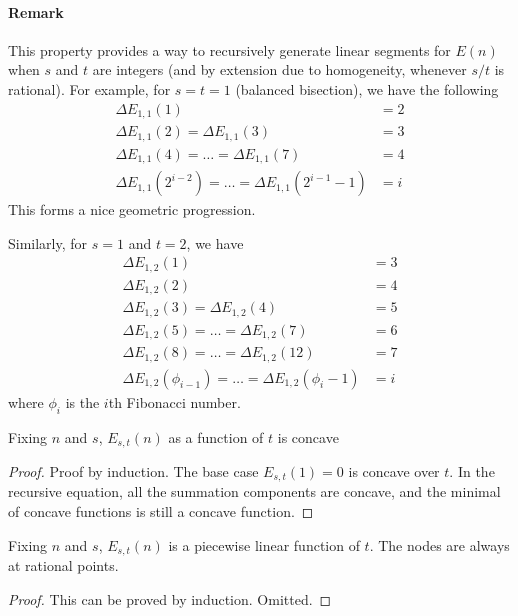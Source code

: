 \documentclass[]{article}
\begin{document}
\paragraph{Remark}

This property provides a way to recursively generate linear segments for $E(n)$ when $s$ and $t$ are integers (and by extension due to homogeneity, whenever $s/t$ is rational). For example, for $s = t = 1$ (balanced bisection), we have the following
\begin{align*}
\Delta E_{1,1}(1) &= 2 \\
\Delta E_{1,1}(2) = \Delta E_{1,1}(3) &= 3\\
\Delta E_{1,1}(4) =\dots = \Delta E_{1,1}(7) &= 4\\
\Delta E_{1,1}(2^{i-2}) =\dots = \Delta E_{1,1}(2^{i-1}-1) &= i
\end{align*}
This forms a nice geometric progression.

Similarly, for $s = 1$ and $t = 2$, we have 
\begin{align*}
\Delta E_{1,2}(1) &= 3 \\
\Delta E_{1,2}(2) &= 4\\
\Delta E_{1,2}(3)  = \Delta E_{1,2}(4) &= 5\\
\Delta E_{1,2}(5) =\dots = \Delta E_{1,2}(7) &= 6\\
\Delta E_{1,2}(8) =\dots = \Delta E_{1,2}(12) &= 7\\
\Delta E_{1,2}(\phi_{i -1}) =\dots = \Delta E_{1,2}(\phi_{i} - 1) &= i
\end{align*}
where $\phi_i$ is the $i$th Fibonacci number.
	
\vspace{1cm}
\begin{lemma}[$s,t$-concavity]
Fixing $n$ and $s$, $E_{s,t}(n)$ as a function of $t$ is concave 
\end{lemma}
\begin{proof}
Proof by induction. The base case $E_{s,t}(1) = 0$ is concave over $t$. In the recursive equation, all the summation components are concave, and the minimal of concave functions is still a concave function.
\end{proof}

\vspace{1cm}
\begin{lemma}[$s,t$-linearity]
Fixing $n$ and $s$, $E_{s,t}(n)$ is a piecewise linear function of $t$. The nodes are always at rational points.
\end{lemma}
\begin{proof}
	This can be proved by induction. Omitted.
\end{proof}
\end{document}
